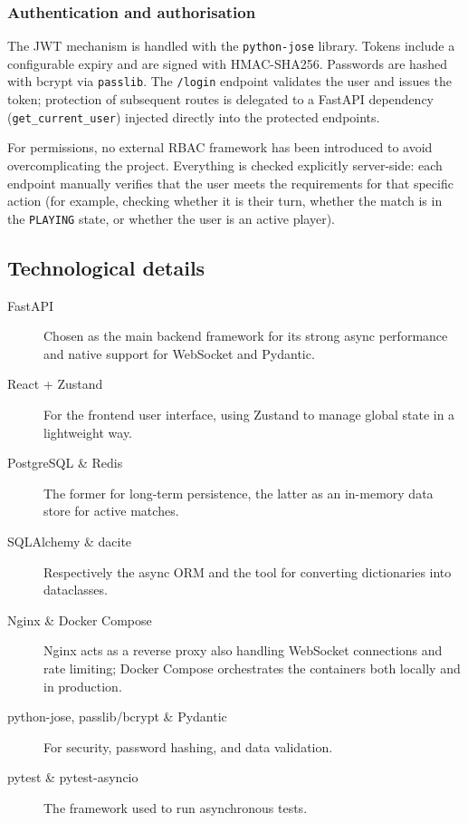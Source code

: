 \documentclass{scrartcl}
\begin{document}
\subsubsection*{Authentication and authorisation}

The JWT mechanism is handled with the \texttt{python-jose} library.
Tokens include a configurable expiry and are signed with HMAC-SHA256.
Passwords are hashed with bcrypt via \texttt{passlib}.
The \texttt{/login} endpoint validates the user and issues the token;
protection of subsequent routes is delegated to a FastAPI dependency
(\texttt{get\_current\_user}) injected directly into the protected endpoints.

For permissions, no external RBAC framework has been introduced to avoid
overcomplicating the project.
Everything is checked explicitly server-side: each endpoint manually verifies
that the user meets the requirements for that specific action
(for example, checking whether it is their turn, whether the match is
in the \texttt{PLAYING} state, or whether the user is an active player).

\subsection{Technological details}\label{technological-details}

\begin{description}
  \item[FastAPI] Chosen as the main backend framework for its strong async
  performance and native support for WebSocket and Pydantic.

  \item[React + Zustand] For the frontend user interface, using Zustand
  to manage global state in a lightweight way.

  \item[PostgreSQL \& Redis] The former for long-term persistence,
  the latter as an in-memory data store for active matches.

  \item[SQLAlchemy \& dacite] Respectively the async ORM and the tool
  for converting dictionaries into dataclasses.

  \item[Nginx \& Docker Compose] Nginx acts as a reverse proxy also handling
  WebSocket connections and rate limiting; Docker Compose orchestrates
  the containers both locally and in production.

  \item[python-jose, passlib/bcrypt \& Pydantic] For security, password
  hashing, and data validation.

  \item[pytest \& pytest-asyncio] The framework used to run asynchronous tests.
\end{description}
\end{document}
